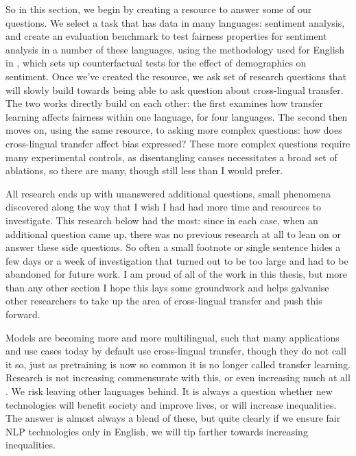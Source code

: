 So in this section, we begin by creating a resource to answer some of our questions. We select a task that has data in many languages: sentiment analysis, and create an evaluation benchmark to test fairness properties for sentiment analysis in a number of these languages, using the methodology used for English in \citet{kiritchenko-mohammad-2018-examining}, which sets up counterfactual tests for the effect of demographics on sentiment.  Once we've created the resource, we ask set of research questions that will slowly build towards being able to ask question about cross-lingual transfer. The two works directly build on each other: the first examines how transfer learning affects fairness within one language, for four languages. The second then moves on, using the same resource, to asking more complex questions: how does cross-lingual transfer affect bias expressed? These more complex questions require many experimental controls, as disentangling causes necessitates a broad set of ablations, so there are many, though still less than I would prefer.

All research ends up with unanswered additional questions, small phenomena discovered along the way that I wish I had had more time and resources to investigate. This research below had the most: since in each case, when an additional question came up, there was no previous research at all to lean on or answer these side questions. So often a small footnote or single sentence hides a few days or a week of investigation that turned out to be too large and had to be abandoned for future work. I am proud of all of the work in this thesis, but more than any other section I hope this lays some groundwork and helps galvanise other researchers to take up the area of cross-lingual transfer and push this forward. 

Models are becoming more and more multilingual, such that many applications and use cases today by default use cross-lingual transfer, though they do not call it so, just as pretraining is now so common it is no longer called transfer learning. Research is not increasing commensurate with this, or even increasing much at all \citep{EMNLP paper}. We risk leaving other languages behind. It is always a question whether new technologies will benefit society and improve lives, or will increase inequalities. The answer is almost always a blend of these, but quite clearly if we ensure fair NLP technologies only in English, we will tip farther towards increasing inequalities. 
